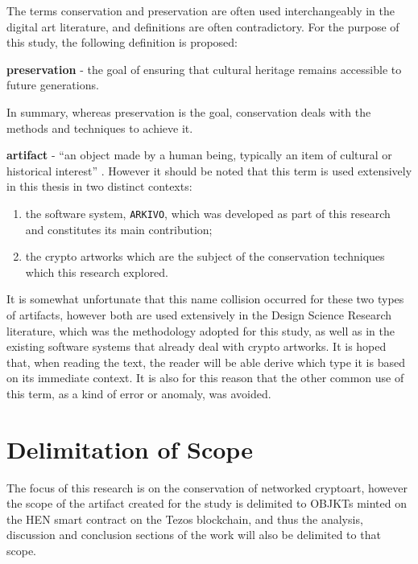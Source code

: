 \vspace{0.5cm}

The terms conservation and preservation are often used interchangeably in the digital art literature, and definitions are often contradictory. For the purpose of this study, the following definition is proposed:

\vspace{0.5cm}
\textbf{preservation} - the goal of ensuring that cultural heritage remains accessible to future generations.

\vspace{0.5cm}

In summary, whereas preservation is the goal, conservation deals with the methods and techniques to achieve it.

\vspace{0.5cm}

\textbf{artifact} - ``an object made by a human being, typically an item of cultural or historical interest'' \cite{OxfordAdvancedLearner}. However it should be noted that this term is used extensively in this thesis in two distinct contexts:

\begin{enumerate}
    \item the software system, \texttt{ARKIVO}, which was developed as part of this research and constitutes its main contribution;
    \item the crypto artworks which are the subject of the conservation techniques which this research explored.
\end{enumerate}

\vspace{0.5cm}

It is somewhat unfortunate that this name collision occurred for these two types of artifacts, however both are used extensively in the Design Science Research literature, which was the methodology adopted for this study, as well as in the existing software systems that already deal with crypto artworks. It is hoped that, when reading the text, the reader will be able derive which type it is based on its immediate context. It is also for this reason that the other common use of this term, as a kind of error or anomaly, was avoided. 

\section{Delimitation of Scope}

The focus of this research is on the conservation of networked cryptoart, however the scope of the artifact created for the study is delimited to OBJKTs minted on the HEN smart contract on the Tezos blockchain, and thus the analysis, discussion and conclusion sections of the work will also be delimited to that scope.

